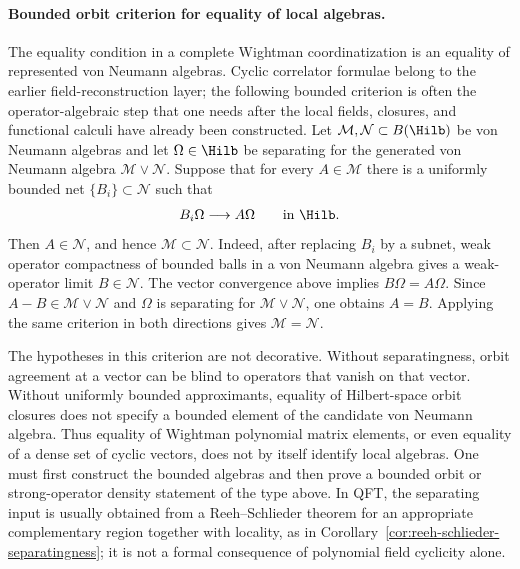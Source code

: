 \paragraph{Bounded orbit criterion for equality of local algebras.}
The equality condition in a complete Wightman coordinatization is an equality
of represented von Neumann algebras.  Cyclic correlator formulae belong to
the earlier field-reconstruction layer; the following bounded criterion is
often the operator-algebraic step that one needs after the local fields,
closures, and functional calculi have already been constructed.  Let
\(\mathcal M,\mathcal N\subset B(\Hilb)\) be von Neumann algebras and let
\(\Omega\in\Hilb\) be separating for the generated von Neumann algebra
\(\mathcal M\vee\mathcal N\).  Suppose that for every
\(A\in\mathcal M\) there is a uniformly bounded net
\(\{B_i\}\subset\mathcal N\) such that
\[
  B_i\Omega\longrightarrow A\Omega
  \qquad\text{in }\Hilb .
\]
Then \(A\in\mathcal N\), and hence \(\mathcal M\subset\mathcal N\).  Indeed,
after replacing \(B_i\) by a subnet, weak operator compactness of bounded
balls in a von Neumann algebra gives a weak-operator limit
\(B\in\mathcal N\).  The vector convergence above implies
\(B\Omega=A\Omega\).  Since \(A-B\in\mathcal M\vee\mathcal N\) and
\(\Omega\) is separating for \(\mathcal M\vee\mathcal N\), one obtains
\(A=B\).  Applying the same criterion in both directions gives
\(\mathcal M=\mathcal N\).

The hypotheses in this criterion are not decorative.  Without separatingness,
orbit agreement at a vector can be blind to operators that vanish on that
vector.  Without uniformly bounded approximants, equality of Hilbert-space
orbit closures does not specify a bounded element of the candidate von
Neumann algebra.  Thus equality of Wightman polynomial matrix elements, or
even equality of a dense set of cyclic vectors, does not by itself identify
local algebras.  One must first construct the bounded algebras and then prove
a bounded orbit or strong-operator density statement of the type above.  In
QFT, the separating input is usually obtained from a Reeh--Schlieder theorem
for an appropriate complementary region together with locality, as in
Corollary~\ref{cor:reeh-schlieder-separatingness}; it is not a formal
consequence of polynomial field cyclicity alone.

